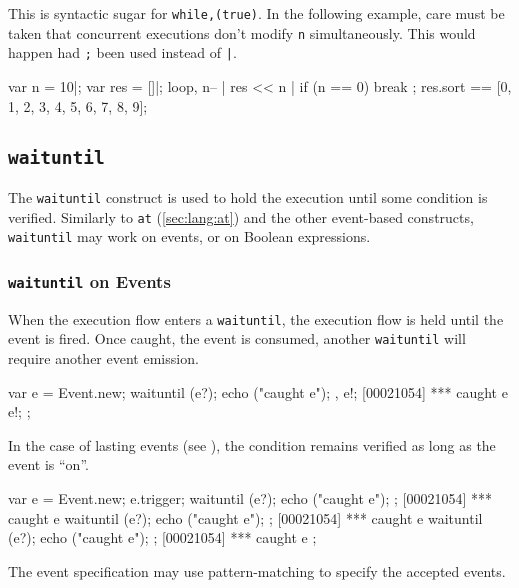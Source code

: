 This is syntactic sugar for \lstinline|while,(true)|.  In the
following example, care must be taken that concurrent executions don't
modify \lstinline|n| simultaneously.  This would happen had
\lstinline|;| been used instead of \lstinline'|'.

\begin{urbiassert}
{
  var n = 10|;
  var res = []|;
  loop,
  {
    n-- |
    res << n |
    if (n == 0)
      break
  };
  res.sort
}
==
[0, 1, 2, 3, 4, 5, 6, 7, 8, 9];
\end{urbiassert}

\subsection{\lstinline|waituntil|}
\label{sec:lang:waituntil}

The \lstinline|waituntil| construct is used to hold the execution
until some condition is verified.  Similarly to \lstinline|at|
(\autoref{sec:lang:at}) and the other event-based constructs,
\lstinline|waituntil| may work on events, or on Boolean expressions.

\subsubsection{\lstinline'waituntil' on Events}

When the execution flow enters a \lstinline|waituntil|, the execution
flow is held until the event is fired.  Once caught, the event is
consumed, another \lstinline|waituntil| will require another event
emission.

\begin{urbiscript}
{
  var e = Event.new;
  {
    waituntil (e?);
    echo ("caught e");
  },
  e!;
[00021054] *** caught e
  e!;
};
\end{urbiscript}

In the case of lasting events (see ), the
condition remains verified as long as the event is ``on''.

\begin{urbiscript}
{
  var e = Event.new;
  e.trigger;
  {
    waituntil (e?);
    echo ("caught e");
  };
[00021054] *** caught e
  {
    waituntil (e?);
    echo ("caught e");
  };
[00021054] *** caught e
  {
    waituntil (e?);
    echo ("caught e");
  };
[00021054] *** caught e
};
\end{urbiscript}

The event specification may use pattern-matching to specify the
accepted events.

